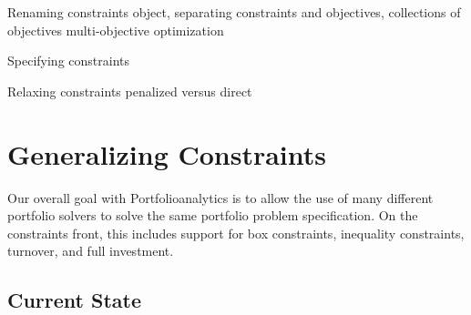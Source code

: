 \documentclass[12pt,letterpaper,english]{article}
\begin{document}
Renaming constraints object, separating constraints and objectives, collections of objectives multi-objective optimization

Specifying constraints

Relaxing constraints  penalized versus direct



\section{Generalizing Constraints \label{sec:constraints}}
Our overall goal with Portfolioanalytics is to allow the use of many different portfolio solvers to solve the same portfolio problem specification.  On the constraints front, this includes support for box constraints, inequality constraints, turnover, and full investment.
\subsection{Current State \label{ss:currentstate}}
\end{document}
